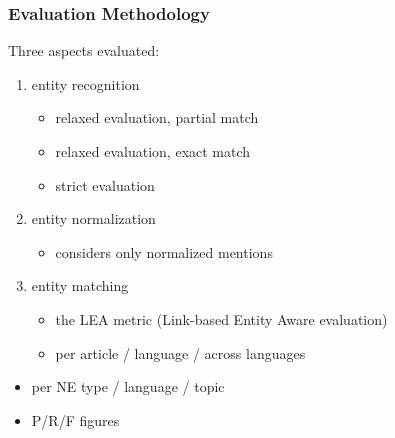 \documentclass{beamer}
\begin{document}
\begin{frame}
 \frametitle{Evaluation Methodology}

Three aspects evaluated:

\begin{enumerate}

\item entity recognition

\begin{itemize}
\item relaxed evaluation, partial match
\item relaxed evaluation, exact match
\item strict evaluation
\end{itemize}

\item entity normalization

\begin{itemize}
\item considers only normalized mentions
\end{itemize}

\item entity matching

\begin{itemize}
\item the LEA metric (Link-based Entity Aware evaluation)
\item per article / language / across languages
\end{itemize}

\end{enumerate}

\begin{itemize}

\item per NE type / language / topic
\item P/R/F figures

\end{itemize}

\end{frame}
\end{document}

